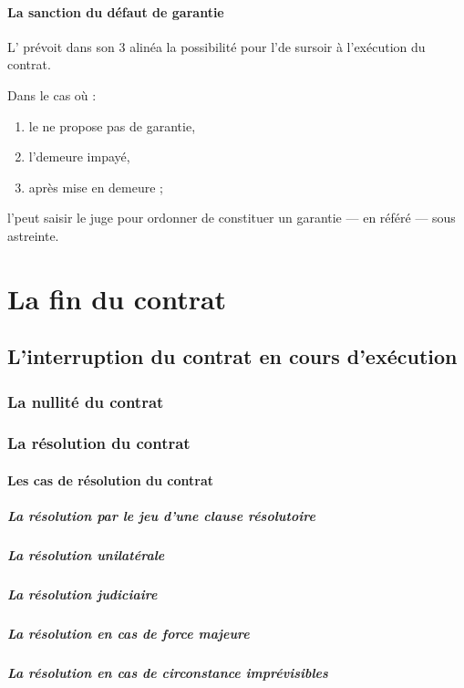 				\paragraph{La sanction du défaut de garantie} L' prévoit dans son 3\ieme{} alinéa la possibilité pour l'\E de sursoir à l'exécution du contrat.
				
				Dans le cas où :
				\begin{enumerate}
					\item le \Mo ne propose pas de garantie,
					\item l'\E demeure impayé,
					\item après mise en demeure ;
				\end{enumerate}
				l'\E peut saisir le juge pour ordonner de constituer un garantie --- en référé --- sous astreinte.
	
	\section{La fin du contrat}
	
		\subsection{L'interruption du contrat en cours d'exécution}
		
			\subsubsection{La nullité du contrat}
			
			\subsubsection{La résolution du contrat}
			
				\paragraph{Les cas de résolution du contrat}
				
					\subparagraph{La résolution par le jeu d'une clause résolutoire}
					
					\subparagraph{La résolution unilatérale}
					
					\subparagraph{La résolution judiciaire}
					
					\subparagraph{La résolution en cas de force majeure}
					
					\subparagraph{La résolution en cas de circonstance imprévisibles}
				
